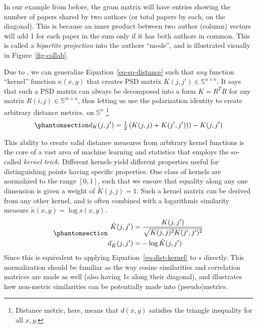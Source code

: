 \documentclass[%
	12pt,
		oneside,
		letterpaper
]{book}
\begin{document}
In our example from before, the gram matrix will have entries showing
the number of papers shared by two authors (or total papers by each, on
the diagonal). This is because an inner product between two author
(column) vectors will add 1 for each paper in the sum only if it has
both authors in common. This is called a \emph{bipartite
projection}\autocite{Bipartitenetworkprojection_Zhou2007,atlasaspiringnetwork_Coscia2021}
into the authors ``mode'', and is illustrated visually in
Figure~\ref{fig-collab}.

Due to \autocite{Metricspacespositive_Schoenberg1938}, we can generalize
Equation~\ref{eq-sq-distance} such that \emph{any} function ``kernel''
function \(\kappa(x,y)\) that creates PSD matrix
\(K(j,j')\in\mathbb{S}^{n\times n}\). It says that such a PSD matrix can
always be decomposed into a form \(K=R^TR\) for any matrix
\(R(i,j)\in \mathbb{S}^{m\times n}\), thus letting us use the
polarization identity to create arbitrary distance metrics. on
\(\mathbb{S}^n\)
\autocite{SimilaritiesgraphsKernels_Avrachenkov2019}\footnote{ Distance
  metric, here, means that \(d(x,y)\) satisfies the triangle inequality
  for all \(x,y\).}
\begin{equation}\phantomsection\label{eq-dist-kernel}{
d_K(j,j') = \tfrac{1}{2}\left(K(j,j)+K(j',j'))\right)-K(j,j')
}\end{equation}

This ability to create valid distance measures from arbitrary kernel
functions is the core of a vast area of machine learning and statistics
that employs the so-called \emph{kernel trick}.
\autocite{Patternrecognition_Theodoridis2010} Different kernels yield
different properties useful for distinguishing points having specific
properties. One class of kernels are normalized to the range \([0,1]\),
such that we ensure that equality along any one dimension is given a
weight of \(\tilde{K}(j,j)=1\). Such a kernel matrix can be derived from
any other kernel, and is often combined with a logarithmic similarity
measure \(\tilde{\kappa}(x,y)=\log{s(x,y)}\).
\begin{equation}\phantomsection\label{eq-norm-diag}{
\begin{aligned}
\tilde{K}(j,j') &= \frac{K(j,j')}{\sqrt{K(j,j)^2K(j',j')^2}}\\
d_{\tilde{K}}(j,j') &= -\log{\tilde{K}(j,j')}
\end{aligned}
}\end{equation} Since this is equivalent to applying
Equation~\ref{eq-dist-kernel} to \(s\) directly. This normalization
should be familiar as the way cosine similarities and correlation
matrices are made as well (also having 1s along their diagonal), and
illustrates how non-metric similarities can be potentially made into
(pseudo)metrics.
\end{document}
